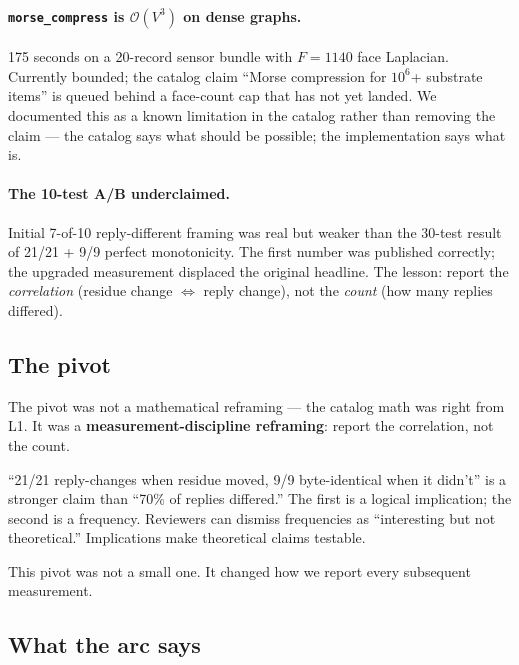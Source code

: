 \documentclass[11pt,letterpaper]{article}
\begin{document}
\paragraph{\texttt{morse\_compress} is $\mathcal{O}(V^3)$ on dense
graphs.} 175 seconds on a 20-record sensor bundle with $F = 1140$
face Laplacian. Currently bounded; the catalog claim ``Morse
compression for $10^6$+ substrate items'' is queued behind a
face-count cap that has not yet landed. We documented this as a
known limitation in the catalog rather than removing the claim --- the
catalog says what should be possible; the implementation says what
is.

\paragraph{The 10-test A/B underclaimed.} Initial 7-of-10
reply-different framing was real but weaker than the 30-test result
of 21/21 + 9/9 perfect monotonicity. The first number was published
correctly; the upgraded measurement displaced the original headline.
The lesson: report the \emph{correlation} (residue change
$\Leftrightarrow$ reply change), not the \emph{count} (how many
replies differed).

\subsection{The pivot}

The pivot was not a mathematical reframing --- the catalog math was
right from L1. It was a \textbf{measurement-discipline reframing}:
report the correlation, not the count.

``21/21 reply-changes when residue moved, 9/9 byte-identical when it
didn't'' is a stronger claim than ``70\% of replies differed.'' The
first is a logical implication; the second is a frequency. Reviewers
can dismiss frequencies as ``interesting but not theoretical.''
Implications make theoretical claims testable.

This pivot was not a small one. It changed how we report every
subsequent measurement.

\subsection{What the arc says}
\end{document}
